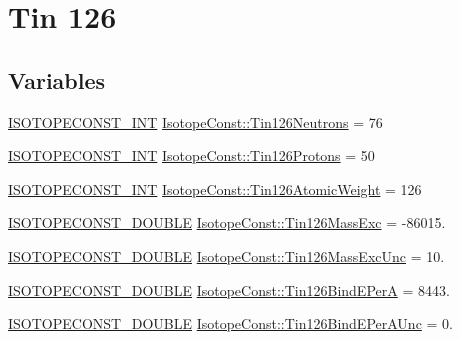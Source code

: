 \hypertarget{group___isotope_const-_tin-_sn126}{}\section{Tin 126}
\label{group___isotope_const-_tin-_sn126}
\subsection*{Variables}
\begin{DoxyCompactItemize}
\item 
\mbox{\hyperlink{group___isotope_const-_macros_ga5f18360b3e99483a35c32d789e62621c}{I\+S\+O\+T\+O\+P\+E\+C\+O\+N\+S\+T\+\_\+\+I\+NT}} \mbox{\hyperlink{group___isotope_const-_tin-_sn126_ga3b4be477beb872a04756f10cc25046a1}{Isotope\+Const\+::\+Tin126\+Neutrons}} = 76
\item 
\mbox{\hyperlink{group___isotope_const-_macros_ga5f18360b3e99483a35c32d789e62621c}{I\+S\+O\+T\+O\+P\+E\+C\+O\+N\+S\+T\+\_\+\+I\+NT}} \mbox{\hyperlink{group___isotope_const-_tin-_sn126_gabdf6e1650621a73388e15da95142206e}{Isotope\+Const\+::\+Tin126\+Protons}} = 50
\item 
\mbox{\hyperlink{group___isotope_const-_macros_ga5f18360b3e99483a35c32d789e62621c}{I\+S\+O\+T\+O\+P\+E\+C\+O\+N\+S\+T\+\_\+\+I\+NT}} \mbox{\hyperlink{group___isotope_const-_tin-_sn126_gaf963ed9c2b83015793d279d41956c294}{Isotope\+Const\+::\+Tin126\+Atomic\+Weight}} = 126
\item 
\mbox{\hyperlink{group___isotope_const-_macros_ga8f45a7272ce02c0b4c65c44636ed719a}{I\+S\+O\+T\+O\+P\+E\+C\+O\+N\+S\+T\+\_\+\+D\+O\+U\+B\+LE}} \mbox{\hyperlink{group___isotope_const-_tin-_sn126_gac288197b8d2527b9cbbf857d6567d321}{Isotope\+Const\+::\+Tin126\+Mass\+Exc}} = -\/86015.
\item 
\mbox{\hyperlink{group___isotope_const-_macros_ga8f45a7272ce02c0b4c65c44636ed719a}{I\+S\+O\+T\+O\+P\+E\+C\+O\+N\+S\+T\+\_\+\+D\+O\+U\+B\+LE}} \mbox{\hyperlink{group___isotope_const-_tin-_sn126_ga7dbba78c14677a140405e196046f441a}{Isotope\+Const\+::\+Tin126\+Mass\+Exc\+Unc}} = 10.
\item 
\mbox{\hyperlink{group___isotope_const-_macros_ga8f45a7272ce02c0b4c65c44636ed719a}{I\+S\+O\+T\+O\+P\+E\+C\+O\+N\+S\+T\+\_\+\+D\+O\+U\+B\+LE}} \mbox{\hyperlink{group___isotope_const-_tin-_sn126_gad923fee2908bbb50fe8a5d2734704413}{Isotope\+Const\+::\+Tin126\+Bind\+E\+PerA}} = 8443.
\item 
\mbox{\hyperlink{group___isotope_const-_macros_ga8f45a7272ce02c0b4c65c44636ed719a}{I\+S\+O\+T\+O\+P\+E\+C\+O\+N\+S\+T\+\_\+\+D\+O\+U\+B\+LE}} \mbox{\hyperlink{group___isotope_const-_tin-_sn126_ga097428c183c1f2d952c60d121d52cdde}{Isotope\+Const\+::\+Tin126\+Bind\+E\+Per\+A\+Unc}} = 0.

\end{DoxyCompactItemize}
